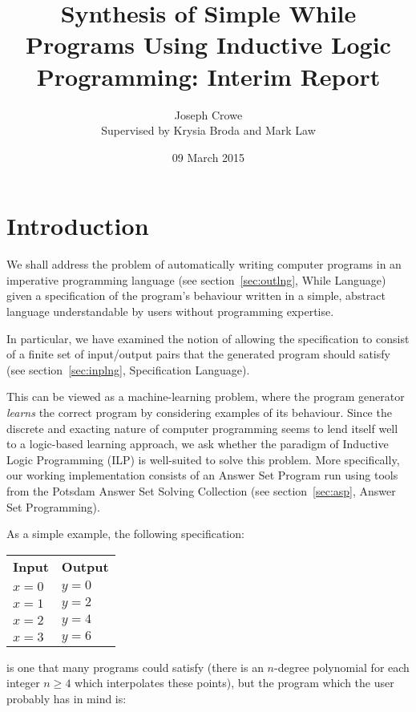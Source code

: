 \documentclass[a4paper,twoside,notitlepage]{article}
\begin{document}
\title{Synthesis of Simple While Programs Using Inductive Logic Programming:
       Interim Report}
\author{Joseph Crowe \\ Supervised by Krysia Broda and Mark Law}
\date{09 March 2015}
\maketitle

\tableofcontents
\clearpage

\section{Introduction}

We shall address the problem of automatically writing computer programs in an 
imperative programming language (see section~\ref{sec:outlng}, While Language) 
given a specification of the program's behaviour written in a simple, abstract 
language understandable by users without programming expertise.

In particular, we have examined the notion of allowing the specification to 
consist of a finite set of input/output pairs that the generated program 
should satisfy (see section~\ref{sec:inplng}, Specification Language).

This can be viewed as a machine-learning problem, where the program generator 
\emph{learns} the correct program by considering examples of its behaviour. Since the 
discrete and exacting nature of computer programming seems to lend itself well to a 
logic-based learning approach, we ask whether the paradigm of Inductive Logic 
Programming (ILP)\cite{muggleton94} is well-suited to solve this problem. More 
specifically, our working implementation consists of an Answer Set Program run using 
tools from the Potsdam Answer Set Solving Collection\cite{potassco} (see 
section~\ref{sec:asp}, Answer Set Programming).

As a simple example, the following specification:

\begin{tabular}{ll}
    \textbf{Input} & \textbf{Output}
\\  $x = 0$        & $y = 0$
\\  $x = 1$        & $y = 2$
\\  $x = 2$        & $y = 4$
\\  $x = 3$        & $y = 6$
\end{tabular}

is one that many programs could satisfy (there is an $n$-degree polynomial for each 
integer $n \geq 4$ which interpolates these points), but the program which the user 
probably has in mind is:
\end{document}
